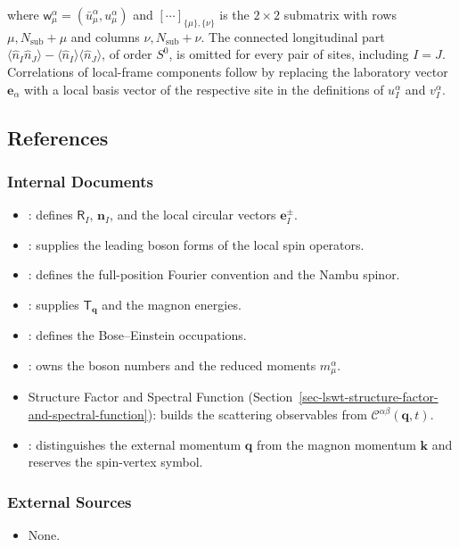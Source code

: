 where \(\mathsf w_\mu^\alpha=(\bar u_\mu^\alpha,u_\mu^\alpha)\) and \([\cdots]_{\{\mu\},\{\nu\}}\) is the \(2\times2\) submatrix with rows \(\mu,N_{\mathrm{sub}}+\mu\) and columns \(\nu,N_{\mathrm{sub}}+\nu\). The connected longitudinal part \(\langle\hat n_I\hat n_J\rangle-\langle\hat n_I\rangle\langle\hat n_J\rangle\), of order \(S^0\), is omitted for every pair of sites, including \(I=J\). Correlations of local-frame components follow by replacing the laboratory vector \(\mathbf e_\alpha\) with a local basis vector of the respective site in the definitions of \(u_I^\alpha\) and \(v_I^\alpha\).

\subsection{References}

\subsubsection{Internal Documents}

\begin{itemize}
\tightlist
\item
  : defines \(\mathsf R_I\), \(\mathbf n_I\), and the local circular vectors \(\mathbf e_I^\pm\).
\item
  : supplies the leading boson forms of the local spin operators.
\item
  : defines the full-position Fourier convention and the Nambu spinor.
\item
  : supplies \(\mathsf T_{\mathbf q}\) and the magnon energies.
\item
  : defines the Bose--Einstein occupations.
\item
  : owns the boson numbers and the reduced moments \(m_\mu^\alpha\).
\item
  Structure Factor and Spectral Function (Section~\ref{sec-lswt-structure-factor-and-spectral-function}): builds the scattering observables from \(\mathcal C^{\alpha\beta}(\mathbf q,t)\).
\item
  : distinguishes the external momentum \(\mathbf q\) from the magnon momentum \(\mathbf k\) and reserves the spin-vertex symbol.
\end{itemize}

\subsubsection{External Sources}

\begin{itemize}
\tightlist
\item
  None.
\end{itemize}
